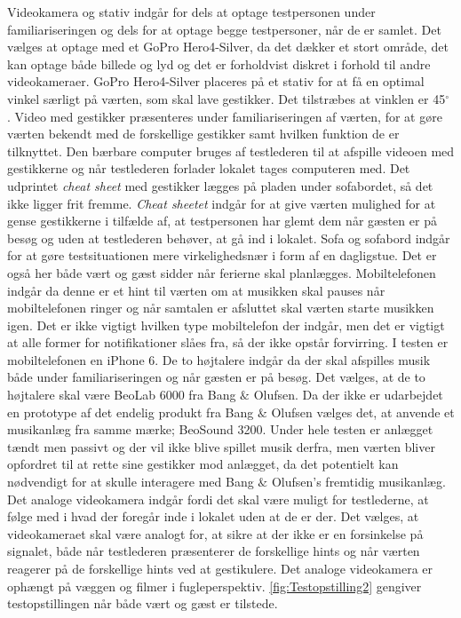 Videokamera og stativ indgår for dels at optage testpersonen under familiariseringen og dels for at optage begge testpersoner, når de er samlet. Det vælges at optage med et GoPro Hero4-Silver, da det dækker et stort område, det kan optage både billede og lyd og det er forholdvist diskret i forhold til andre videokameraer. GoPro Hero4-Silver placeres på et stativ for at få en optimal vinkel særligt på værten, som skal lave gestikker. Det tilstræbes at vinklen er 45$^{\circ}$ . Video med gestikker præsenteres under familiariseringen af værten, for at gøre værten bekendt med de forskellige gestikker samt hvilken funktion de er tilknyttet. Den bærbare computer bruges af testlederen til at afspille videoen med gestikkerne og når testlederen forlader lokalet tages computeren med. Det udprintet \textit{cheat sheet} med gestikker lægges på pladen under sofabordet, så det ikke ligger frit fremme. \textit{Cheat sheetet} indgår for at give værten mulighed for at gense gestikkerne i tilfælde af, at testpersonen har glemt dem når gæsten er på besøg og uden at testlederen behøver, at gå ind i lokalet. Sofa og sofabord indgår for at gøre testsituationen mere virkelighedsnær i form af en dagligstue. Det er også her både vært og gæst sidder når ferierne skal planlægges. Mobiltelefonen indgår da denne er et hint til værten om at musikken skal pauses når mobiltelefonen ringer og når samtalen er afsluttet skal værten starte musikken igen. Det er ikke vigtigt hvilken type mobiltelefon der indgår, men det er vigtigt at alle former for notifikationer slåes fra, så der ikke opstår forvirring. I testen er mobiltelefonen en iPhone 6. De to højtalere indgår da der skal afspilles musik både under familiariseringen og når gæsten er på besøg. Det vælges, at de to højtalere skal være BeoLab 6000 fra Bang $\&$ Olufsen. Da der ikke er udarbejdet en prototype af det endelig produkt fra Bang $\&$ Olufsen vælges det, at anvende et musikanlæg fra samme mærke; BeoSound 3200. Under hele testen er anlægget tændt men passivt og der vil ikke blive spillet musik derfra, men værten bliver opfordret til at rette sine gestikker mod anlægget, da det potentielt kan nødvendigt for at skulle interagere med Bang $\&$ Olufsen's fremtidig musikanlæg. Det analoge videokamera indgår fordi det skal være muligt for testlederne, at følge med i hvad der foregår inde i lokalet uden at de er der. Det vælges, at videokameraet skal være analogt for, at sikre at der ikke er en forsinkelse på signalet, både når testlederen præsenterer de forskellige hints og når værten reagerer på de forskellige hints ved at gestikulere. Det analoge videokamera er ophængt på væggen og filmer i fugleperspektiv. \autoref{fig:Testopstilling2} gengiver testopstillingen når både vært og gæst er tilstede. 
